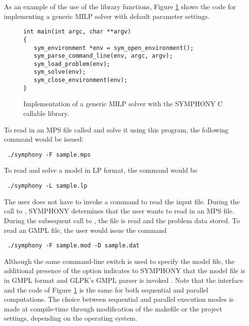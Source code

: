 \noindent As an example of the use of the library functions, Figure
\ref{default_main} shows the code for implementing a generic MILP solver with
default parameter settings.
\begin{figure}[tb]
{\color{Brown}
\begin{Verbatim}[frame=lines]
int main(int argc, char **argv)
{
   sym_environment *env = sym_open_environment();
   sym_parse_command_line(env, argc, argv);
   sym_load_problem(env);
   sym_solve(env);
   sym_close_environment(env);
}
\end{Verbatim}
}
\caption{Implementation of a generic MILP solver with the SYMPHONY
C callable library. \label{default_main}}
\end{figure}
To read in an MPS file called  and solve it using 
this program, the following command would be issued: \\
{\color{Brown}
\begin{verbatim}
 ./symphony -F sample.mps
\end{verbatim}
}
To read and solve a model in LP format, the command would be
{\color{Brown}
\begin{verbatim}
 ./symphony -L sample.lp
\end{verbatim}
} 
The user does not have to invoke a command to read the input file. During the
call to  , SYMPHONY determines that the
user wants to read in an MPS file. During the subsequent call to
, the file is read and the problem data stored.
To read an GMPL file, the user would issue the command
{\color{Brown}
\begin{verbatim}
 ./symphony -F sample.mod -D sample.dat
\end{verbatim}
}
Although the same command-line switch is used to specify the model file, the
additional presence of the  option indicates to SYMPHONY that the
model file is in GMPL format and GLPK's GMPL parser is invoked
\cite{GLPK}. Note that the interface and the code of Figure \ref{default_main}
is the same for both sequential and parallel computations. The choice between
sequential and parallel execution modes is made at compile-time through
modification of the makefile or the project settings, depending on the
operating system.


